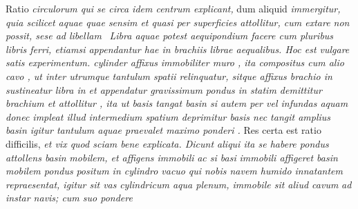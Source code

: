 \pend
\pstart
{} Ratio \textit{circulorum\protect{} qui se circa idem centrum explicant,} dum aliquid \textit{immergitur, quia scilicet aquae quae sensim et quasi per superficies attollitur, cum extare non possit, sese ad libellam }
\pend 
\count{}
\count{}
\pstart 
{} \, 
\textit{Libra aquae potest aequipondium facere cum pluribus libris ferri, etiamsi appendantur hae in brachiis librae aequalibus. Hoc est vulgare satis experimentum.
cylinder  affixus}
\textit{immobiliter muro , ita compositus cum alio cavo , ut inter utrumque tantulum spatii relinquatur, sitque affixus brachio  in  sustineatur libra in  et appendatur gravissimum pondus  in  statim demittitur brachium  et attollitur , ita ut basis  tangat basin  si autem per  vel  infundas aquam donec impleat illud intermedium spatium deprimitur basis  nec tangit amplius basin  igitur tantulum aquae praevalet maximo ponderi .} 
Res certa est ratio difficilis,
\textit{et vix quod sciam bene explicata. Dicunt aliqui ita se habere pondus}
\textit{}
\textit{attollens basin}
\textit{}
\textit{mobilem, et affigens immobili}
\textit{}\textit{ ac si basi}
\textit{}\textit{ immobili affigeret basin}
\textit{}
\textit{mobilem pondus}
\textit{}\textit{ positum in cylindro vacuo}
\textit{}\textit{ qui nobis navem humido innatantem repraesentat, igitur sit vas}
\textit{}\textit{ cylindricum aqua plenum, immobile sit aliud cavum}
\textit{}\textit{ ad instar navis; cum suo pondere}
\textit{}
